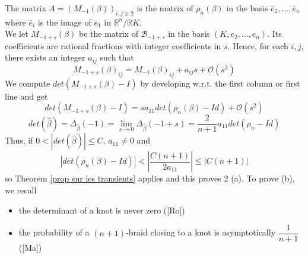 \documentclass[12pt]{article}
\begin{document}
	The matrix $A=(M_{-1}(\beta))_{i,j\geq 2}$ is the matrix of $\rho_n(\beta)$ in the basis $\bar{e}_2,...,\bar{e}_{n}$ where $\bar{e}_i$ is the image of $e_1$ in $\mathbb{R}^{n}/\mathbb{R}K$.\\
	We let $M_{-1+s}(\beta)$ be the matrix of ${\mathcal B}_{-1+s}$ in the basis $(K,e_2,...,e_{n})$. Its coefficients are rational fractions with integer coefficients in $s$. Hence, for each $i,j$, there exists an integer $a_{ij}$ such that
	\begin{equation}
	M_{-1+s}(\beta)_{ij}=M_{-1}(\beta)_{ij}+a_{ij}s+{\mathcal O}(s^2)
	\end{equation}
	We compute $det(M_{-1+s}(\beta)-I)$ by developing w.r.t. the first column or first line and get
	\begin{equation}
	det(M_{-1+s}(\beta)-I)=sa_{11}det(\rho_n(\beta)-Id)+{\mathcal O}(s^2)
	\end{equation}
	\begin{equation}\label{determinant impair}
	det(\hat{\beta})=\Delta_{\hat{\beta}}(-1)=\lim_{s\longrightarrow 0}\Delta_{\hat{\beta}}(-1+s)=\dfrac{2}{n+1}a_{11}det(\rho_n-Id)
	\end{equation}
	Thus, if $0<|det(\hat{\beta})|\leq C$, $a_{11}\neq 0$ and  
	$$|det(\rho_n(\beta)-Id)|<|\dfrac{C(n+1)}{2a_{11}}|\leq |C(n+1)|$$
	so Theorem \ref{prop sur les transients} applies and this proves 2 (a). To prove (b), we recall
	\begin{itemize}
		\item 
		the determinant of a knot is never zero ([Ro])
		\item
		the probability of a $(n+1)$-braid closing to a knot is asymptotically $\dfrac{1}{n+1}$ ([Ma]) 
	\end{itemize}
\end{document}

